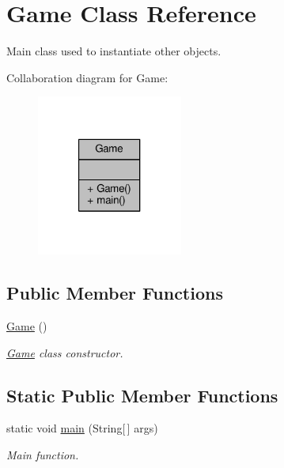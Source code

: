 \hypertarget{classGame}{\section{Game Class Reference}
\label{classGame}
}


Main class used to instantiate other objects.  




Collaboration diagram for Game\-:
\nopagebreak
\begin{figure}[H]
\begin{center}
\leavevmode
\includegraphics[width=136pt]{classGame__coll__graph}
\end{center}
\end{figure}
\subsection*{Public Member Functions}
\begin{DoxyCompactItemize}
\item 
\hyperlink{classGame_a2e034e53e9c032964ecd2a831b29a616}{Game} ()
\begin{DoxyCompactList}\small\item\em \hyperlink{classGame}{Game} class constructor. \end{DoxyCompactList}\end{DoxyCompactItemize}
\subsection*{Static Public Member Functions}
\begin{DoxyCompactItemize}
\item 
static void \hyperlink{classGame_ae52595a27ac1b327b05db2129ad81fca}{main} (String\mbox{[}$\,$\mbox{]} args)
\begin{DoxyCompactList}\small\item\em Main function. \end{DoxyCompactList}\end{DoxyCompactItemize}


